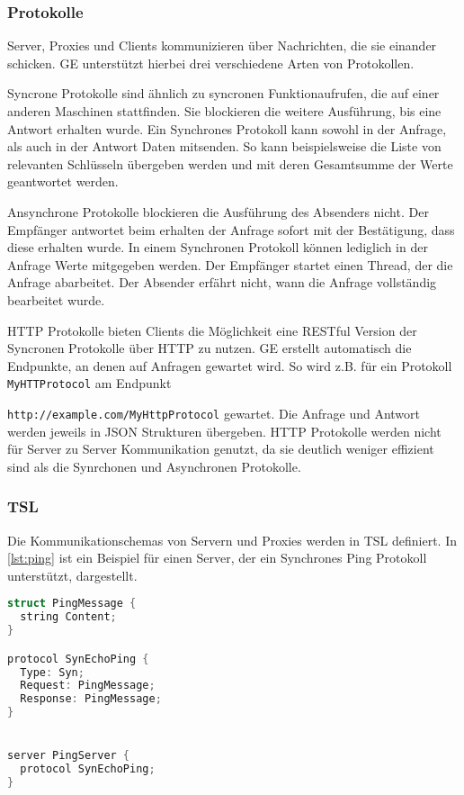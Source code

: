 \subsubsection{Protokolle}

Server, Proxies und Clients kommunizieren über Nachrichten, die sie einander schicken. GE unterstützt hierbei drei verschiedene Arten von Protokollen.


Syncrone Protokolle sind ähnlich zu syncronen Funktionaufrufen, die auf einer anderen Maschinen stattfinden. Sie blockieren die weitere Ausführung, bis
eine Antwort erhalten wurde. Ein Synchrones Protokoll kann sowohl in der Anfrage, als auch in der Antwort Daten mitsenden. So kann beispielsweise die Liste von
relevanten Schlüsseln übergeben werden und mit deren Gesamtsumme der Werte geantwortet werden.


Ansynchrone Protokolle blockieren die Ausführung des Absenders nicht. Der Empfänger antwortet beim erhalten der Anfrage sofort mit der Bestätigung, dass diese erhalten wurde.
In einem Synchronen Protokoll können lediglich in der Anfrage Werte mitgegeben werden.
Der Empfänger startet einen Thread, der die Anfrage abarbeitet. Der Absender erfährt nicht, wann die Anfrage vollständig bearbeitet wurde.


HTTP Protokolle bieten Clients die Möglichkeit eine RESTful Version der Syncronen Protokolle über HTTP zu nutzen. GE erstellt automatisch die Endpunkte, an denen
auf Anfragen gewartet wird. So wird z.B. für ein Protokoll \verb|MyHTTProtocol| am Endpunkt

\verb|http://example.com/MyHttpProtocol| gewartet. Die Anfrage und
Antwort werden jeweils in JSON Strukturen übergeben. HTTP Protokolle werden nicht für Server zu Server Kommunikation genutzt, da sie deutlich weniger effizient sind als die
Synrchonen und Asynchronen Protokolle.

\subsubsection{TSL}

Die Kommunikationschemas von Servern und Proxies werden in TSL definiert. In \ref{lst:ping} ist ein Beispiel für einen Server, der ein Synchrones Ping Protokoll unterstützt, dargestellt.

\begin{lstlisting}[language=c,label={lst:ping}, caption={In TSL definiertes Ping Protokoll}]
struct PingMessage {
  string Content;
}

protocol SynEchoPing {
  Type: Syn;
  Request: PingMessage;
  Response: PingMessage;
}


server PingServer {
  protocol SynEchoPing;
}
\end{lstlisting}

